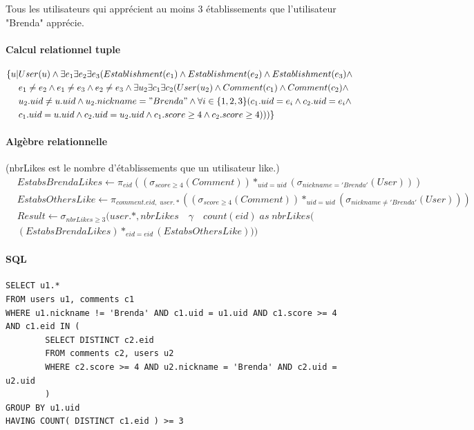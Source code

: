 \documentclass[11pt,a4paper]{report}
\begin{document}
\noindent Tous les utilisateurs qui apprécient au moins 3 établissements que l'utilisateur "Brenda" apprécie.
\paragraph*{Calcul relationnel tuple}
\begin{align*}
\{ u | & User(u) \wedge \exists e_{1} \exists e_{2} \exists e_{3} ( Establishment(e_{1}) \wedge
Establishment(e_{2}) \wedge Establishment(e_{3}) \wedge \\ 
& e_{1} \neq e_{2} \wedge e_{1} \neq e_{3} \wedge e_{2} \neq e_{3} \wedge \exists u_{2} \exists c_{1} \exists c_{2} ( User(u_{2}) \wedge Comment(c_{1}) \wedge Comment(c_{2}) \wedge \\
& u_{2}.uid \neq u.uid \wedge u_{2}.nickname = "Brenda" \wedge \forall i \in \{1,2,3 \}(c_{1}.uid=e_{i} \wedge c_{2}.uid=e_{i} \wedge  \\
& c_{1}.uid = u.uid \wedge c_{2}.uid = u_{2}.uid \wedge  c_{1}.score \geq 4 \wedge  c_{2}.score \geq 4  )))
\}
\end{align*}
\paragraph*{Algèbre relationnelle} 
(nbrLikes est le nombre d'établissements que un utilisateur like.)
\begin{align*}
& EstabsBrendaLikes \leftarrow \pi_{eid} ( ( \sigma_{score \ge 4} (Comment)) *_{uid=uid} (\sigma_{nickname = 'Brenda'} (User)) ) \\
& EstabsOthersLike \leftarrow \pi_{comment.eid, \; user.*} ( ( \sigma_{score \ge 4} (Comment)) *_{uid=uid} (\sigma_{nickname \neq 'Brenda'} (User)) )\\ 
& Result \leftarrow \sigma_{nbrLikes \ge 3} (user.*, nbrLikes \quad \gamma \quad count(eid) \; as\;  nbrLikes ( \\
& (EstabsBrendaLikes)*_{eid=eid}(EstabsOthersLike)) )
\end{align*}


\paragraph*{SQL}
\begin{verbatim}
SELECT u1.*
FROM users u1, comments c1
WHERE u1.nickname != 'Brenda' AND c1.uid = u1.uid AND c1.score >= 4 AND c1.eid IN (
        SELECT DISTINCT c2.eid
        FROM comments c2, users u2
        WHERE c2.score >= 4 AND u2.nickname = 'Brenda' AND c2.uid = u2.uid
        )
GROUP BY u1.uid
HAVING COUNT( DISTINCT c1.eid ) >= 3
\end{verbatim}
\end{document}
